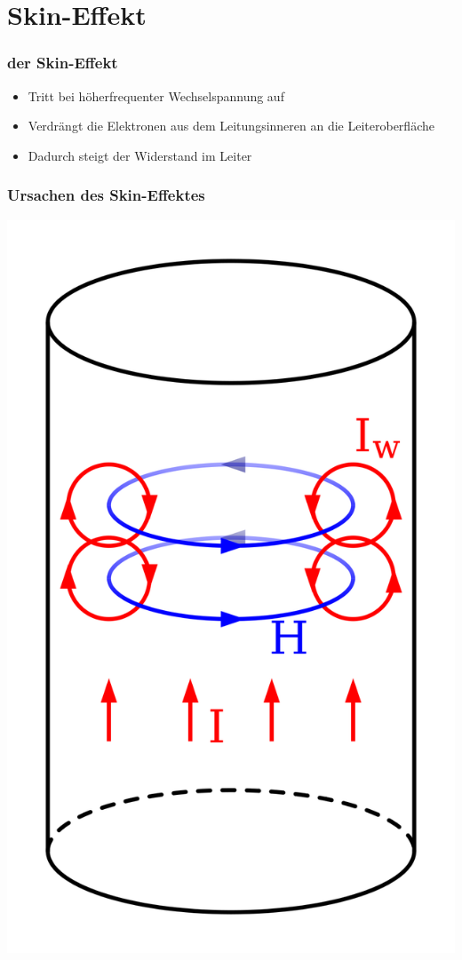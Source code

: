 \section{Skin-Effekt}

\begin{frame}
  \frametitle{der Skin-Effekt}
  \begin{itemize}
    \item Tritt bei höherfrequenter Wechselspannung auf
    \item Verdrängt die Elektronen aus dem Leitungsinneren an die Leiteroberfläche
    \item Dadurch steigt der Widerstand im Leiter
  \end{itemize}
\end{frame}

\begin{frame}
    \frametitle{Ursachen des Skin-Effektes}
      \begin{center}
        \includegraphics[scale=0.06]{a02/Skineffect.png}\\

\end{center}
\end{frame}
